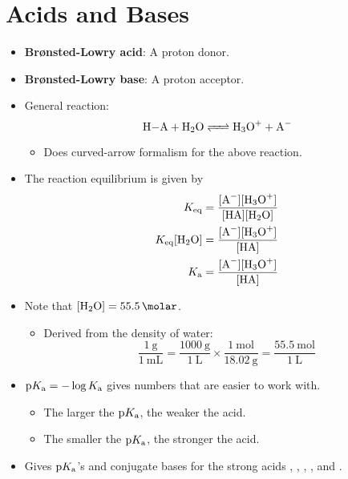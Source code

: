 \documentclass[../notes.tex]{subfiles}
\begin{document}
\section{Acids and Bases}
\begin{itemize}
    \item {}\textbf{Br\o nsted-Lowry acid}: A proton donor.
    \item \textbf{Br\o nsted-Lowry base}: A proton acceptor.
    \item General reaction:
    \begin{equation*}
        \ce{H-A + H2O <=> H3O+ + A-}
    \end{equation*}
    \begin{itemize}
        \item Does curved-arrow formalism for the above reaction.
    \end{itemize}
    \item The reaction equilibrium is given by
    \begin{align*}
        K_\text{eq} &= \frac{[\ce{A-}][\ce{H3O+}]}{[\ce{HA}][\ce{H2O}]}\\
        K_\text{eq}[\ce{H2O}] &= \frac{[\ce{A-}][\ce{H3O+}]}{[\ce{HA}]}\\
       \Ka &= \frac{[\ce{A-}][\ce{H3O+}]}{[\ce{HA}]}
    \end{align*}
    \item Note that $[\ce{H2O}]=\SI{55.5}{\molar}$.
    \begin{itemize}
        \item Derived from the density of water:
        \begin{equation*}
            \frac{\SI{1}{\gram}}{\SI{1}{\milli\liter}} = \frac{\SI{1000}{\gram}}{\SI{1}{\liter}}\times\frac{\SI{1}{\mole}}{\SI{18.02}{\gram}}
            = \frac{\SI{55.5}{\mole}}{\SI{1}{\liter}}
        \end{equation*}
    \end{itemize}
    \item $\text{p}K_\text{a}=-\log K_\text{a}$ gives numbers that are easier to work with.
    \begin{itemize}
        \item The larger the $\text{p}K_\text{a}$, the weaker the acid.
        \item The smaller the $\text{p}K_\text{a}$, the stronger the acid.
    \end{itemize}
    \item Gives $\text{p}K_\text{a}$'s and conjugate bases for the strong acids , , , , and .

\end{itemize}
\end{document}
